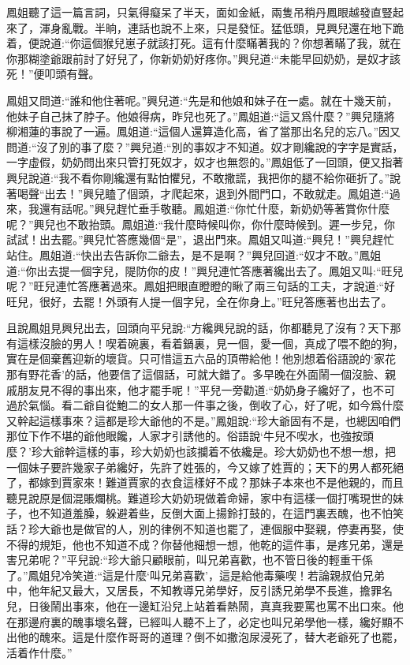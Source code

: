 \begin{parag}
    鳳姐聽了這一篇言詞，只氣得癡呆了半天，面如金紙，兩隻吊稍丹鳳眼越發直豎起來了，渾身亂戰。半晌，連話也說不上來，只是發怔。猛低頭，見興兒還在地下跪着，便說道:“你這個猴兒崽子就該打死。這有什麼瞞著我的？你想著瞞了我，就在你那糊塗爺跟前討了好兒了，你新奶奶好疼你。”興兒道:“未能早回奶奶，是奴才該死！”便叩頭有聲。
\end{parag}


\begin{parag}
    鳳姐又問道:“誰和他住著呢。”興兒道:“先是和他娘和妹子在一處。就在十幾天前，他妹子自己抹了脖子。他娘得病，昨兒也死了。”鳳姐道:“這又爲什麼？”興兒隨將柳湘蓮的事說了一遍。鳳姐道:“這個人還算造化高，省了當那出名兒的忘八。”因又問道:“沒了別的事了麼？”興兒道:“別的事奴才不知道。奴才剛纔說的字字是實話，一字虛假，奶奶問出來只管打死奴才，奴才也無怨的。”鳳姐低了一回頭，便又指著興兒說道:“我不看你剛纔還有點怕懼兒，不敢撒謊，我把你的腿不給你砸折了。”說著喝聲“出去！”興兒瞌了個頭，才爬起來，退到外間門口，不敢就走。鳳姐道:“過來，我還有話呢。”興兒趕忙垂手敬聽。鳳姐道:“你忙什麼，新奶奶等著賞你什麼呢？”興兒也不敢抬頭。鳳姐道:“我什麼時候叫你，你什麼時候到。遲一步兒，你試試！出去罷。”興兒忙答應幾個“是”，退出門來。鳳姐又叫道:“興兒！”興兒趕忙站住。鳳姐道:“快出去告訴你二爺去，是不是啊？”興兒回道:“奴才不敢。”鳳姐道:“你出去提一個字兒，隄防你的皮！”興兒連忙答應著纔出去了。鳳姐又叫:“旺兒呢？”旺兒連忙答應著過來。鳳姐把眼直瞪瞪的瞅了兩三句話的工夫，才說道:“好旺兒，很好，去罷！外頭有人提一個字兒，全在你身上。”旺兒答應著也出去了。
\end{parag}


\begin{parag}
    且說鳳姐見興兒出去，回頭向平兒說:“方纔興兒說的話，你都聽見了沒有？天下那有這樣沒臉的男人！喫着碗裏，看着鍋裏，見一個，愛一個，真成了喂不飽的狗，實在是個棄舊迎新的壞貨。只可惜這五六品的頂帶給他！他別想着俗語說的‘家花那有野花香’的話，他要信了這個話，可就大錯了。多早晚在外面鬧一個沒臉、親戚朋友見不得的事出來，他才罷手呢！”平兒一旁勸道:“奶奶身子纔好了，也不可過於氣惱。看二爺自從鮑二的女人那一件事之後，倒收了心，好了呢，如今爲什麼又幹起這樣事來？這都是珍大爺他的不是。”鳳姐說:“珍大爺固有不是，也總因咱們那位下作不堪的爺他眼饞，人家才引誘他的。俗語說‘牛兒不喫水，也強按頭麼？’珍大爺幹這樣的事，珍大奶奶也該攔着不依纔是。珍大奶奶也不想一想，把一個妹子要許幾家子弟纔好，先許了姓張的，今又嫁了姓賈的；天下的男人都死絕了，都嫁到賈家來！難道賈家的衣食這樣好不成？那妹子本來也不是他親的，而且聽見說原是個混賬爛桃。難道珍大奶奶現做着命婦，家中有這樣一個打嘴現世的妹子，也不知道羞臊，躲避着些，反倒大面上揚鈴打鼓的，在這門裏丟醜，也不怕笑話？珍大爺也是做官的人，別的律例不知道也罷了，連個服中娶親，停妻再娶，使不得的規矩，他也不知道不成？你替他細想一想，他乾的這件事，是疼兄弟，還是害兄弟呢？”平兒說:“珍大爺只顧眼前，叫兄弟喜歡，也不管日後的輕重干係了。”鳳姐兒冷笑道:“這是什麼‘叫兄弟喜歡’，這是給他毒藥喫！若論親叔伯兄弟中，他年紀又最大，又居長，不知教導兄弟學好，反引誘兄弟學不長進，擔罪名兒，日後鬧出事來，他在一邊缸沿兒上站着看熱鬧，真真我要罵也罵不出口來。他在那邊府裏的醜事壞名聲，已經叫人聽不上了，必定也叫兄弟學他一樣，纔好顯不出他的醜來。這是什麼作哥哥的道理？倒不如撒泡尿浸死了，替大老爺死了也罷，活着作什麼。”
\end{parag}


